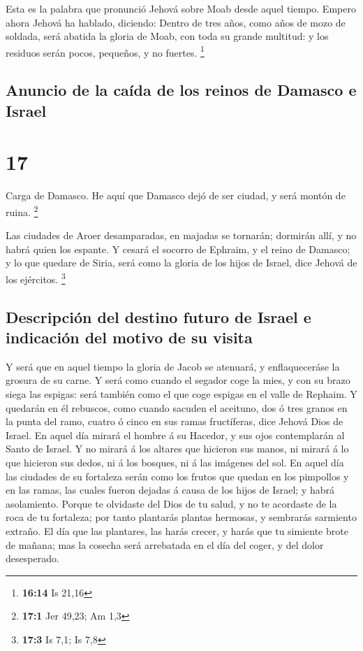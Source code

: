  Esta es la palabra que pronunció Jehová sobre Moab desde
aquel tiempo.  Empero ahora Jehová ha hablado, diciendo:
Dentro de tres años, como años de mozo de soldada, será abatida la
gloria de Moab, con toda su grande multitud: y los residuos serán pocos,
pequeños, y no fuertes. \footnote{\textbf{16:14} Is 21,16}

\hypertarget{anuncio-de-la-cauxedda-de-los-reinos-de-damasco-e-israel}{%
\subsection{Anuncio de la caída de los reinos de Damasco e
Israel}\label{anuncio-de-la-cauxedda-de-los-reinos-de-damasco-e-israel}}

\hypertarget{section-16}{%
\section{17}\label{section-16}}

 Carga de Damasco. He aquí que Damasco dejó de ser ciudad,
y será montón de ruina. \footnote{\textbf{17:1} Jer 49,23; Am 1,3}

 Las ciudades de Aroer desamparadas, en majadas se
tornarán; dormirán allí, y no habrá quien los espante.  Y
cesará el socorro de Ephraim, y el reino de Damasco; y lo que quedare de
Siria, será como la gloria de los hijos de Israel, dice Jehová de los
ejércitos. \footnote{\textbf{17:3} Is 7,1; Is 7,8}

\hypertarget{descripciuxf3n-del-destino-futuro-de-israel-e-indicaciuxf3n-del-motivo-de-su-visita}{%
\subsection{Descripción del destino futuro de Israel e indicación del
motivo de su
visita}\label{descripciuxf3n-del-destino-futuro-de-israel-e-indicaciuxf3n-del-motivo-de-su-visita}}

 Y será que en aquel tiempo la gloria de Jacob se
atenuará, y enflaqueceráse la grosura de su carne.  Y será
como cuando el segador coge la mies, y con su brazo siega las espigas:
será también como el que coge espigas en el valle de Rephaim.
 Y quedarán en él rebuscos, como cuando sacuden el
aceituno, dos ó tres granos en la punta del ramo, cuatro ó cinco en sus
ramas fructíferas, dice Jehová Dios de Israel.  En aquel
día mirará el hombre á su Hacedor, y sus ojos contemplarán al Santo de
Israel.  Y no mirará á los altares que hicieron sus manos,
ni mirará á lo que hicieron sus dedos, ni á los bosques, ni á las
imágenes del sol.  En aquel día las ciudades de su
fortaleza serán como los frutos que quedan en los pimpollos y en las
ramas, las cuales fueron dejadas á causa de los hijos de Israel; y habrá
asolamiento.  Porque te olvidaste del Dios de tu salud, y
no te acordaste de la roca de tu fortaleza; por tanto plantarás plantas
hermosas, y sembrarás sarmiento extraño.  El día que las
plantares, las harás crecer, y harás que tu simiente brote de mañana;
mas la cosecha será arrebatada en el día del coger, y del dolor
desesperado.

